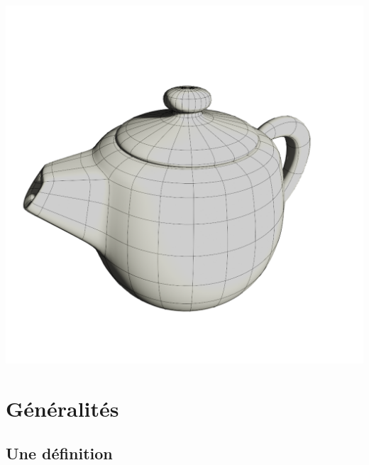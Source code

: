 \documentclass[11pt,class=report,crop=false]{standalone}
\begin{document}

%
%
%



\begin{center}
	\includegraphics[scale=\myscale,scale=0.15,trim={2cm 5cm 2cm 5cm},clip]{figures/teapot}
\end{center}


\section{Généralités}

\subsection{Une définition}
\end{document}
